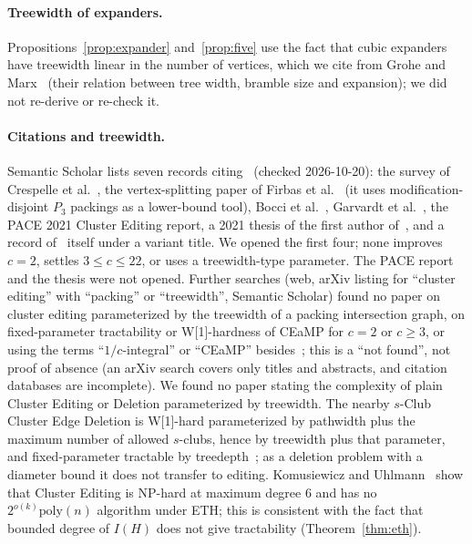 \paragraph{Treewidth of expanders.} Propositions~\ref{prop:expander} and~\ref{prop:five} use the fact that cubic expanders have treewidth linear in the number of vertices, which we cite from Grohe and Marx~\cite{GM09} (their relation between tree width, bramble size and expansion); we did not re-derive or re-check it.

\paragraph{Citations and treewidth.} Semantic Scholar lists seven records citing~\cite{LPS23} (checked 2026-10-20): the survey of Crespelle et al.~\cite{Crespelle23}, the vertex-splitting paper of Firbas et al.~\cite{Split24} (it uses modification-disjoint $P_3$ packings as a lower-bound tool), Bocci et al.~\cite{Bocci24}, Garvardt et al.~\cite{Garvardt23}, the PACE 2021 Cluster Editing report, a 2021 thesis of the first author of~\cite{LPS23}, and a record of~\cite{LPS23} itself under a variant title. We opened the first four; none improves $c=2$, settles $3\le c\le22$, or uses a treewidth-type parameter. The PACE report and the thesis were not opened. Further searches (web, arXiv listing for ``cluster editing'' with ``packing'' or ``treewidth'', Semantic Scholar) found no paper on cluster editing parameterized by the treewidth of a packing intersection graph, on fixed-parameter tractability or W[1]-hardness of CEaMP for $c=2$ or $c\ge3$, or using the terms ``$1/c$-integral'' or ``CEaMP'' besides~\cite{LPS23}; this is a ``not found'', not proof of absence (an arXiv search covers only titles and abstracts, and citation databases are incomplete). We found no paper stating the complexity of plain Cluster Editing or Deletion parameterized by treewidth. The nearby $s$-Club Cluster Edge Deletion is W[1]-hard parameterized by pathwidth plus the maximum number of allowed $s$-clubs, hence by treewidth plus that parameter, and fixed-parameter tractable by treedepth~\cite{Club25}; as a deletion problem with a diameter bound it does not transfer to editing. Komusiewicz and Uhlmann~\cite{KU12} show that Cluster Editing is NP-hard at maximum degree $6$ and has no $2^{o(k)}\mathrm{poly}(n)$ algorithm under ETH; this is consistent with the fact that bounded degree of $I(H)$ does not give tractability (Theorem~\ref{thm:eth}).
